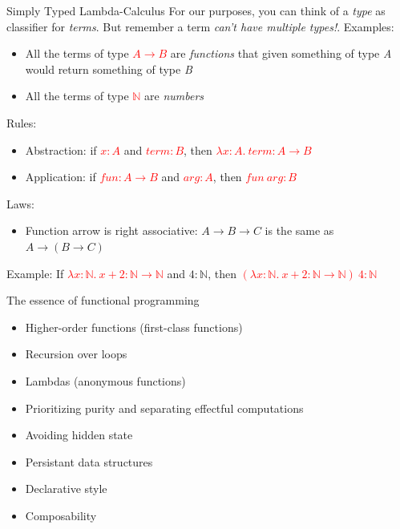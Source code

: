 \documentclass[pdf]{beamer}
\newcommand{\code}[1]{\textcolor{Red}{\textsf{#1}}}
\begin{document}
\begin{frame}{Simply Typed Lambda-Calculus}
  For our purposes, you can think of a \textit{type} as classifier for \textit{terms}. But remember a term \textit{can't have multiple types!}.
  Examples:
  \begin{itemize}
  \item All the terms of type \code{$A \to B$} are \textit{functions} that given something of type \textit{A} would return something of type \textit{B}
  \item All the terms of type \code{$\mathbb{N}$} are \textit{numbers}
  \end{itemize}

  Rules:
  \begin{itemize}
  \item Abstraction: if \code{$x : A$} and \code{$term : B$}, then \code{$\lambda x : A. \: term: A \to B$}
  \item Application: if \code{$fun : A \to B$} and \code{$arg : A$}, then \code{$fun \: arg : B$}
  \end{itemize}

  Laws:
  \begin{itemize}
  \item Function arrow is right associative: $A \to B \to C$ is the same as $A \to (B \to C)$
  \end{itemize}

  Example:
  If \code{$\lambda x : \mathbb{N}. \: x + 2 : \mathbb{N} \to \mathbb{N}$} and {$4 : \mathbb{N}$}, then \code{$(\lambda x : \mathbb{N}. \: x + 2 : \mathbb{N} \to \mathbb{N}) \: 4 : \mathbb{N}$}
\end{frame}

\begin{frame}{The essence of functional programming}
  \begin{itemize}
  \item Higher-order functions (first-class functions)
  \item Recursion over loops
  \item Lambdas (anonymous functions)
  \item Prioritizing purity and separating effectful computations
  \item Avoiding hidden state
  \item Persistant data structures
  \item Declarative style
  \item Composability
  \end{itemize}
\end{frame}
\end{document}
